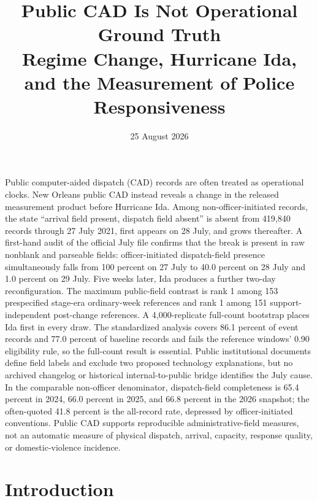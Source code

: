 \documentclass[11pt]{article}
\title{\vspace{-1.7em}\textbf{Public CAD Is Not Operational Ground Truth}\\[0.35em]
\large Regime Change, Hurricane Ida, and the Measurement of Police Responsiveness}
\author{}
\date{25 August 2026}
\begin{document}
\maketitle
\thispagestyle{plain}
\vspace{-1.3em}

\begin{plainbox}[title=Abstract]
Public computer-aided dispatch (CAD) records are often treated as operational clocks. New Orleans public CAD instead reveals a change in the released measurement product before Hurricane Ida. Among non-officer-initiated records, the state ``arrival field present, dispatch field absent'' is absent from 419,840 records through 27 July 2021, first appears on 28 July, and grows thereafter. A first-hand audit of the official July file confirms that the break is present in raw nonblank and parseable fields: officer-initiated dispatch-field presence simultaneously falls from 100 percent on 27 July to 40.0 percent on 28 July and 1.0 percent on 29 July. Five weeks later, Ida produces a further two-day reconfiguration. The maximum public-field contrast is rank 1 among 153 prespecified stage-era ordinary-week references and rank 1 among 151 support-independent post-change references. A 4,000-replicate full-count bootstrap places Ida first in every draw. The standardized analysis covers 86.1 percent of event records and 77.0 percent of baseline records and fails the reference windows' 0.90 eligibility rule, so the full-count result is essential. Public institutional documents define field labels and exclude two proposed technology explanations, but no archived changelog or historical internal-to-public bridge identifies the July cause. In the comparable non-officer denominator, dispatch-field completeness is 65.4 percent in 2024, 66.0 percent in 2025, and 66.8 percent in the 2026 snapshot; the often-quoted 41.8 percent is the all-record rate, depressed by officer-initiated conventions. Public CAD supports reproducible administrative-field measures, not an automatic measure of physical dispatch, arrival, capacity, response quality, or domestic-violence incidence.
\end{plainbox}


\section{Introduction}
\end{document}

